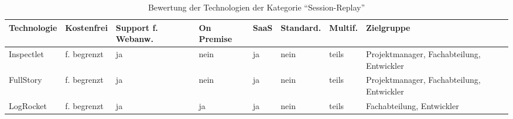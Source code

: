 \begin{table}[H]%
\centering
\addtolength{\leftskip}{-2cm}
\addtolength{\rightskip}{-2cm}
\begin{tabular}{|p{3.05cm}|p{1.8cm}|p{1.7cm}|p{1.2cm}|p{1.3cm}|p{1.7cm}|p{1.3cm}|p{2.6cm}|}
\hline
Technologie & Kostenfrei & Support f. Webanw. & On \mbox{Premise} & SaaS & Standard. & Multif. & Zielgruppe \\
\hline
Inspectlet & f. begrenzt & ja & nein & ja & nein & teils & Projektmanager, Fachabteilung, Entwickler \\
\hline
FullStory & f. begrenzt & ja & nein & ja & nein & teils & Projektmanager, Fachabteilung, Entwickler \\
\hline
LogRocket & f. begrenzt & ja & ja & ja & nein & teils & Fachabteilung, Entwickler \\
\hline
\end{tabular}
\caption{Bewertung der Technologien der Kategorie \enquote{Session-Replay}}
\label{tab:technologie-bewertung-session-replay}
\end{table}

